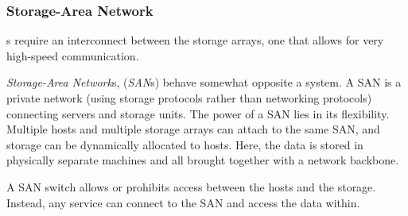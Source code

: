 \subsubsection{Storage-Area Network}\label{subsubsec:Storage_Area_Network}
s require an interconnect between the storage arrays, one that allows for very high-speed communication.

\begin{definition}\label{def:Storage_Area_Network}
  \emph{Storage-Area Network}s, (\emph{SAN}s) behave somewhat opposite a  system.
  A SAN is a private network (using storage protocols rather than networking protocols) connecting servers and storage units.
  The power of a SAN lies in its flexibility.
  Multiple hosts and multiple storage arrays can attach to the same SAN, and storage can be dynamically allocated to hosts.
  Here, the data is stored in physically separate machines and all brought together with a network backbone.

  A SAN switch allows or prohibits access between the hosts and the storage.
  Instead, any service can connect to the SAN and access the data within.
\end{definition}

